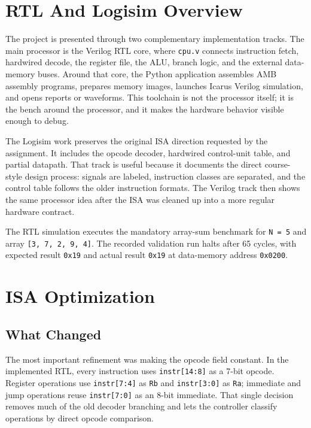 \documentclass[12pt,a4paper]{article}
\begin{document}
\section{RTL And Logisim Overview}

The project is presented through two complementary implementation tracks. The main processor is the Verilog RTL core, where \texttt{cpu.v} connects instruction fetch, hardwired decode, the register file, the ALU, branch logic, and the external data-memory buses. Around that core, the Python application assembles AMB assembly programs, prepares memory images, launches Icarus Verilog simulation, and opens reports or waveforms. This toolchain is not the processor itself; it is the bench around the processor, and it makes the hardware behavior visible enough to debug.

The Logisim work preserves the original ISA direction requested by the assignment. It includes the opcode decoder, hardwired control-unit table, and partial datapath. That track is useful because it documents the direct course-style design process: signals are labeled, instruction classes are separated, and the control table follows the older instruction formats. The Verilog track then shows the same processor idea after the ISA was cleaned up into a more regular hardware contract.

\begin{resultbox}
The RTL simulation executes the mandatory array-sum benchmark for \texttt{N = 5} and array \texttt{[3, 7, 2, 9, 4]}. The recorded validation run halts after 65 cycles, with expected result \texttt{0x19} and actual result \texttt{0x19} at data-memory address \texttt{0x0200}.
\end{resultbox}

\section{ISA Optimization}

\subsection{What Changed}

The most important refinement was making the opcode field constant. In the implemented RTL, every instruction uses \texttt{instr[14:8]} as a 7-bit opcode. Register operations use \texttt{instr[7:4]} as \texttt{Rb} and \texttt{instr[3:0]} as \texttt{Ra}; immediate and jump operations reuse \texttt{instr[7:0]} as an 8-bit immediate. That single decision removes much of the old decoder branching and lets the controller classify operations by direct opcode comparison.
\end{document}
